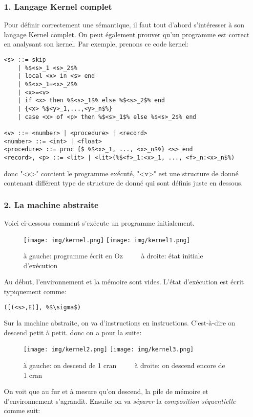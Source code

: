 \documentclass{report}
\begin{document}
\subsubsection{1. Langage Kernel complet}
Pour définir correctement une sémantique, il faut tout d'abord s'intéresser à son langage Kernel complet. On peut également prouver qu'un programme est correct en analysant son kernel. Par exemple, prenons ce code kernel:
\begin{lstlisting}[escapechar=\%]
<s> ::= skip 
	| %$<s>_1 <s>_2$% 
	| local <x> in <s> end 
	| %$<x>_1=<x>_2$% 
	| <x>=<v> 
	| if <x> then %$<s>_1$% else %$<s>_2$% end 
	| {<x> %$<y>_1,...,<y>_n$%} 
	| case <x> of <p> then %$<s>_1$% else %$<s>_2$% end

<v> ::= <number> | <procedure> | <record>  
<number> ::= <int> | <float> 
<procedure> ::= proc {$ %$<x>_1, ..., <x>_n$%} <s> end
<record>, <p> ::= <lit> | <lit>(%$<f>_1:<x>_1, ..., <f>_n:<x>_n$%)
\end{lstlisting}
donc "<s>" contient le programme exécuté, "<v>" est une structure de donné contenant différent type de structure de donné qui sont définis juste en dessous. 

\subsubsection{2. La machine abstraite}
Voici ci-dessous comment s'exécute un programme initialement.

\begin{figure}[H]
\centering
\texttt{[image: img/kernel.png]}
\texttt{[image: img/kernel1.png]}
\caption{à gauche: programme écrit en Oz $\qquad$ à droite: état initiale d'exécution}
\end{figure}
Au début, l'environnement et la mémoire sont vides. L'état d'exécution est écrit typiquement comme:
\begin{lstlisting}[escapechar=\%]
([(<s>,E)], %$\sigma$)
\end{lstlisting} %
Sur la machine abstraite, on va d'instructions en instructions. C'est-à-dire on descend petit à petit.
donc on a pour la suite:
\begin{figure}[H]
\centering
\texttt{[image: img/kernel2.png]}
\texttt{[image: img/kernel3.png]}
\caption{à gauche: on descend de 1 cran $\qquad$ à droite: on descend encore de 1 cran}
\end{figure}
On voit que au fur et à mesure qu'on descend, la pile de mémoire et d'environnement s'agrandit. Ensuite on va \textit{séparer} la \textit{composition séquentielle} comme suit:
\end{document}
